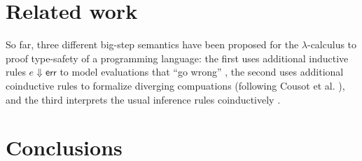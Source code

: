 \documentclass[12pt,a2paper,draft]{article}
\begin{document}
\section{Related work}

So far, three different big-step semantics have been proposed for the $\lambda$-calculus to
proof type-safety of a programming language: the first uses additional inductive rules
$e \Downarrow \textsf{err}$ to model evaluations that ``go wrong'' \cite{Tofte87}, the second uses
additional coinductive rules to formalize diverging compuations (following Cousot et al.
\cite{CousotCousot07,LeroyGrall09}), and the third interprets the usual inference
rules coinductively \cite{LeroyGrall09}. 


\section{Conclusions}




\end{document}
